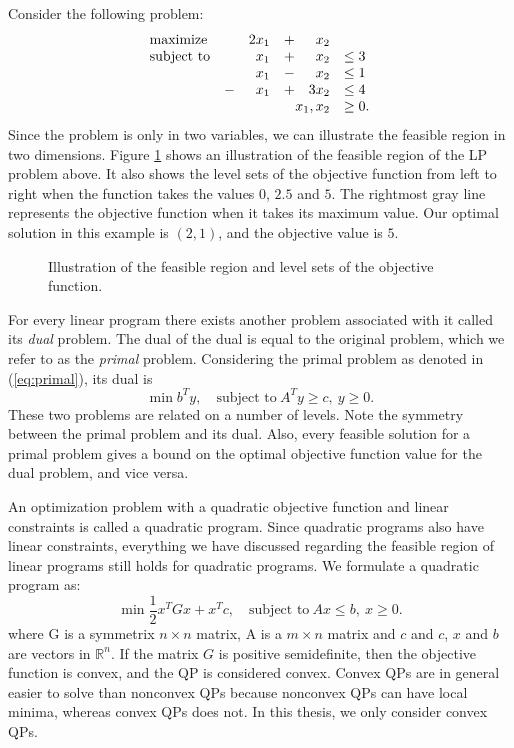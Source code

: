 Consider the following problem:
\[
\begin{array}{lcrcrl}
    \textrm{maximize}   & & 2 x_1 &+&   x_2 \\
    \textrm{subject to} & &   x_1 &+&   x_2 & \leq 3 \\
                        & &   x_1 &-&   x_2 & \leq 1 \\
                        &-&   x_1 &+& 3 x_2 & \leq 4 \\
     \multicolumn{5}{r}{x_1,x_2}            & \geq 0.
\end{array}
\]
Since the problem is only in two variables, we can illustrate the feasible region
in two dimensions. Figure \ref{fig:lpback} shows an illustration of the feasible
region of the LP problem above. It also shows the level sets of the objective
function from left to right when the function takes the values $0$, $2.5$ and
$5$. The rightmost gray line represents the objective function when it takes
its maximum value. Our optimal solution in this example is $(2,1)$, and the
objective value is $5$.

\begin{figure}[ht!]
\centering

\caption{Illustration of the feasible region and level sets of the objective
         function.}
\label{fig:lpback}
\end{figure}

For every linear program there exists another problem associated with it called
its \textit{dual} problem.
The dual of the dual is equal to the original problem, which we refer to as
the \textit{primal} problem.
Considering the primal problem as denoted in (\ref{eq:primal}), its dual is
\[
\min{b^T y},\quad \textrm{subject to}~A^T y \geq c, ~ y \geq 0.
\]
These two problems are related on a number of levels.
Note the symmetry between the primal problem and its dual.
Also, every feasible solution for a primal problem gives a bound on the optimal
objective function value for the dual problem, and vice
versa\cite{vanderbei,nocedal,boyd}.

An optimization problem with a quadratic objective function and linear constraints
is called a quadratic program. Since quadratic programs also have
linear constraints, everything we have discussed regarding the feasible region of
linear programs still holds for quadratic programs. We formulate a quadratic
program as:
\[
\min{\frac{1}{2}x^T G x + x^T c},\quad \textrm{subject to}~Ax \leq b, ~ x \geq 0.
\]
where G is a symmetrix $n \times n$ matrix, A is a $m \times n$ matrix and $c$
and $c$, $x$ and $b$ are vectors in $\mathbb{R}^n$. If the matrix $G$ is
positive semidefinite, then the objective function is convex, and the
QP is considered convex. Convex QPs are in general easier to solve than
nonconvex QPs because nonconvex QPs can have local minima, whereas
convex QPs does not. In this thesis, we only consider convex QPs.

